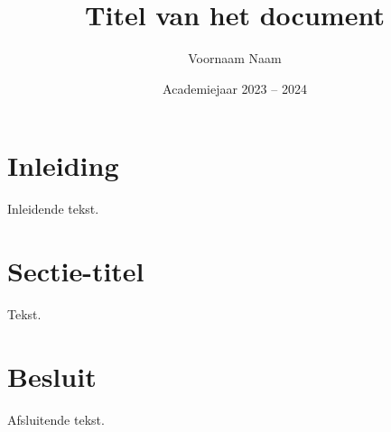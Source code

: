 \documentclass[kulak]{kulakarticle} %
\title{Titel van het document}
\author{Voornaam Naam}
\date{Academiejaar 2023 -- 2024}
\begin{document}
\maketitle

\section*{Inleiding}

Inleidende tekst.

\section{Sectie-titel}

Tekst.

\section*{Besluit}

Afsluitende tekst.
\end{document}

